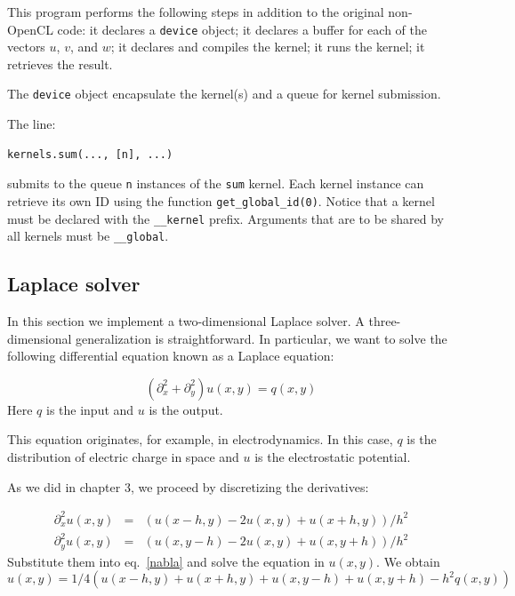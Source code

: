 \documentclass[justified, sixbynine]{tufte-book}
\def\ft{\small\tt}
\theoremstyle{plain}%
\newtheorem * {corollary}{Corollary}
\theoremstyle{definition}
\theoremstyle{remark}
\newtheorem * {remark}{Remark}
\newtheorem * {note}{Note}
\begin{document}
\begin{fullwidth}
This program performs the following steps in addition to the original non-OpenCL code:
it declares a {\ft device} object; it declares a buffer for each of the vectors $u$, $v$, and $w$; it declares and compiles the kernel; it runs the kernel; it retrieves the result.

The {\ft device} object encapsulate the kernel(s) and a queue for kernel submission.

The line:
\begin{lstlisting}
kernels.sum(..., [n], ...)
\end{lstlisting}

submits to the queue {\ft n} instances of the {\ft sum} kernel. Each kernel instance can retrieve its own ID using the function {\ft get\_global\_id(0)}. Notice that a kernel must be declared with the {\ft \_\_kernel} prefix. Arguments that are to be shared by all kernels must be {\ft \_\_global}.

\subsection{Laplace solver}

In this section we implement a two-dimensional Laplace solver. A three-dimensional generalization is straightforward. In particular, we want to solve the following differential equation known as a Laplace equation:

\begin{equation}
(\partial_x^2 + \partial_y^2) u(x, y) = q(x, y)
\label{nabla}
\end{equation}
Here $q$ is the input and $u$ is the output.

This equation originates, for example, in electrodynamics. In this case, $q$ is the distribution of electric charge in space and $u$ is the electrostatic potential.

As we did in chapter 3, we proceed by discretizing the derivatives:

\begin{eqnarray}
\partial_x^2 u(x, y) &=& (u(x-h, y)-2 u(x, y)+u(x+h, y))/h^2 \\
\partial_y^2 u(x, y) &=& (u(x, y-h)-2 u(x, y)+u(x, y+h))/h^2
\end{eqnarray}
Substitute them into eq.~\ref{nabla} and solve the equation in $u(x, y)$. We obtain
\begin{equation}
u(x, y) = 1/4 (u(x-h, y)+u(x+h, y)+u(x, y-h)+u(x, y+h)-h^2 q(x, y))
\label{nabla2}
\end{equation}


\end{fullwidth}
\end{document}

